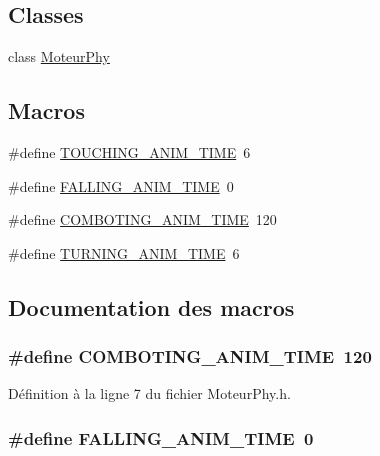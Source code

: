 \subsection*{Classes}
\begin{DoxyCompactItemize}
\item 
class \hyperlink{a00013}{MoteurPhy}
\end{DoxyCompactItemize}
\subsection*{Macros}
\begin{DoxyCompactItemize}
\item 
\#define \hyperlink{a00031_a6c427fbb0cf8ed847dc036610f22b816}{TOUCHING\_\-ANIM\_\-TIME}~6
\item 
\#define \hyperlink{a00031_af58bb74b12f3eaa1d3a50725f525bb9b}{FALLING\_\-ANIM\_\-TIME}~0
\item 
\#define \hyperlink{a00031_a965c16f9790aeb818ea95768b6b33903}{COMBOTING\_\-ANIM\_\-TIME}~120
\item 
\#define \hyperlink{a00031_a948ba274d12951fb0a9306a4d36cf2c7}{TURNING\_\-ANIM\_\-TIME}~6
\end{DoxyCompactItemize}


\subsection{Documentation des macros}
\hypertarget{a00031_a965c16f9790aeb818ea95768b6b33903}{
\subsubsection[{COMBOTING\_\-ANIM\_\-TIME}]{\setlength{\rightskip}{0pt plus 5cm}\#define COMBOTING\_\-ANIM\_\-TIME~120}}
\label{a00031_a965c16f9790aeb818ea95768b6b33903}


Définition à la ligne 7 du fichier MoteurPhy.h.

\hypertarget{a00031_af58bb74b12f3eaa1d3a50725f525bb9b}{
\subsubsection[{FALLING\_\-ANIM\_\-TIME}]{\setlength{\rightskip}{0pt plus 5cm}\#define FALLING\_\-ANIM\_\-TIME~0}}
\label{a00031_af58bb74b12f3eaa1d3a50725f525bb9b}


